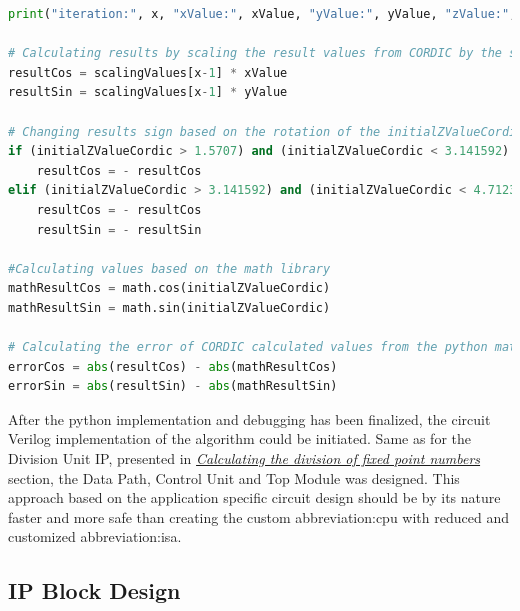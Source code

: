 \documentclass[a4paper, twoside, 11pt]{article}
\newcommand{\fbar}{\FloatBarrier}
\begin{document}
\begin{lstlisting}[language={python}, caption={Python code of \gls{abbreviation:cordic} implementation.}, label= {lst:python-cordic}]
    print("iteration:", x, "xValue:", xValue, "yValue:", yValue, "zValue:", zValue, "sigmaValue:", sigmaValue, "\n")

# Calculating results by scaling the result values from CORDIC by the scalingValue which depends on number of iterations which were made
resultCos = scalingValues[x-1] * xValue
resultSin = scalingValues[x-1] * yValue

# Changing results sign based on the rotation of the initialZValueCordic
if (initialZValueCordic > 1.5707) and (initialZValueCordic < 3.141592):
    resultCos = - resultCos
elif (initialZValueCordic > 3.141592) and (initialZValueCordic < 4.7123):
    resultCos = - resultCos
    resultSin = - resultSin

#Calculating values based on the math library
mathResultCos = math.cos(initialZValueCordic)
mathResultSin = math.sin(initialZValueCordic)

# Calculating the error of CORDIC calculated values from the python math functions
errorCos = abs(resultCos) - abs(mathResultCos)
errorSin = abs(resultSin) - abs(mathResultSin)
\end{lstlisting}

\par
After the python implementation and debugging has been finalized, the circuit Verilog implementation of the algorithm could be initiated. Same as for the Division Unit IP, presented in \hyperref[sec:calculating-the-division-of-fixed-point-numbers]{\textit{Calculating the division of fixed point numbers}} section, the Data Path, Control Unit and Top Module was designed. This approach based on the application specific circuit design should be by its nature faster and more safe than creating the custom \gls{abbreviation:cpu} with reduced and customized \gls{abbreviation:isa}.

    \fbar
    \subsection{IP Block Design}
    \fbar
\end{document}
